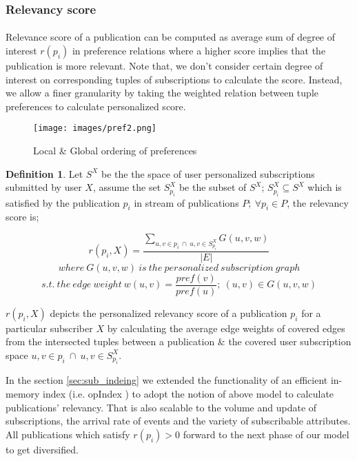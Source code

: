 \documentclass[a4paper,12pt,oneside]{book}
\theoremstyle{definition}
\newtheorem{definition}{Definition}[section]
\theoremstyle{remark}
\begin{document}
\subsubsection{Relevancy score}
\paragraph*{}
Relevance score of a publication can be computed as average sum of degree of interest $r(p_i)$ in preference relations where a higher score implies that the publication is more relevant. Note that, we don't consider certain degree of interest on corresponding tuples of subscriptions to calculate the score. Instead, we allow a finer granularity by taking the weighted relation between tuple preferences to calculate personalized score.

\begin{figure}
\begin{center}
\texttt{[image: images/pref2.png]}
\caption{Local \& Global ordering of preferences}
\label{local_global_ordering}
\end{center}
\end{figure}

\begin{definition}
Let $S^X$ be the the space of user personalized subscriptions submitted by user $X$, assume the set $S^X_{p_i}$ be the subset of $S^X$; $S^X_{p_i} \subseteq S^X$ which is satisfied by the publication $p_i$ in stream of publications $P;\ \forall p_i \in P$, the relevancy score is;
\begin{center}
\[ r(p_i,X)= \frac{ \sum_{u,v\in p_i\ \cap \ u,v \in S^X_{p_i}} G(u,v,w)}{|E|} \]
\[ where\ G(u,v,w)\ is\ the\ personalized\ subscription\ graph\]
\[ s.t.\ the\ edge\ weight\ w(u,v)=\frac{pref(v)}{pref(u)};\ (u,v) \in G(u,v,w) \]
\end{center}

$r(p_i,X)$ depicts the personalized relevancy score of a publication $p_i$ for a particular subscriber $X$ by calculating the average edge weights of covered edges from the intersected tuples between a publication \& the covered user subscription space $u,v\in p_i\ \cap \ u,v \in S^X_{p_i}$.
\end{definition}

In the section \ref{sec:sub_indeing} we extended the functionality of an efficient in-memory index (i.e. opIndex \cite{Zhang2014}) to adopt the notion of above model to calculate publications' relevancy. That is also scalable to the volume and update of subscriptions, the arrival rate of events and the variety of subscribable attributes. All publications which satisfy $r(p_i)>0$ forward to the next phase of our model to get diversified.
\end{document}

